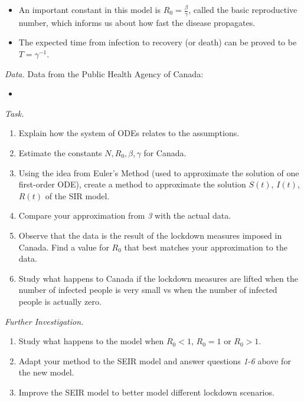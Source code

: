 \begin{important}
\begin{itemize}
\item An important constant in this model is $R_0 = \frac{\beta}{\gamma}$, called the basic reproductive number, which informs us about how fast the disease propagates.
\item The expected time from infection to recovery (or death) can be proved to be $T = \gamma^{-1}$.
\end{itemize}
\end{important}



\newpage

\emph{Data. } Data from the Public Health Agency of Canada:
\begin{itemize}
	\item {}
\end{itemize}


\vspace{1cm}

\emph{Task. } 

\begin{enumerate}[label=\emph{\arabic*.}]
\item Explain how the system of ODEs relates to the assumptions.
\item Estimate the constants $N, R_0, \beta, \gamma$ for Canada.
\item Using the idea from Euler's Method (used to approximate the solution of one first-order ODE), create a method to approximate the solution $S(t)$, $I(t)$, $R(t)$ of the SIR model.
\item Compare your approximation from \emph{3} with the actual data.
\item Observe that the data is the result of the lockdown measures imposed in Canada. Find a value for $R_0$ that best matches your approximation to the data.
\item Study what happens to Canada if the lockdown measures are lifted when the number of infected people is very small vs when the number of infected people is actually zero.
\end{enumerate}




\vfill


\emph{Further Investigation. } 
\begin{enumerate}[label=\emph{\arabic*.}]
\item Study what happens to the model when $R_0<1$, $R_0=1$ or $R_0>1$.
\item Adapt your method to the SEIR model and answer questions \emph{1-6} above for the new model.
\item Improve the SEIR model to better model different lockdown scenarios.

\end{enumerate}

\begin{noexercises}
\end{noexercises}

